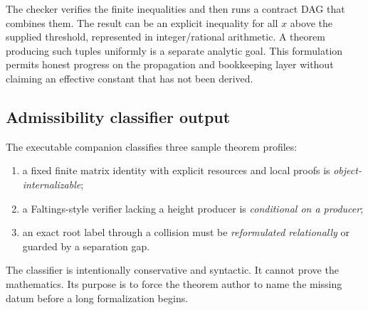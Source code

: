 The checker verifies the finite inequalities and then runs a contract DAG that combines them.  The result can be an explicit inequality for all $x$ above the supplied threshold, represented in integer/rational arithmetic.  A theorem producing such tuples uniformly is a separate analytic goal.  This formulation permits honest progress on the propagation and bookkeeping layer without claiming an effective constant that has not been derived.

\subsection{Admissibility classifier output}

The executable companion classifies three sample theorem profiles:

\begin{enumerate}
  \item a fixed finite matrix identity with explicit resources and local proofs is \emph{object-internalizable};
  \item a Faltings-style verifier lacking a height producer is \emph{conditional on a producer};
  \item an exact root label through a collision must be \emph{reformulated relationally} or guarded by a separation gap.
\end{enumerate}

The classifier is intentionally conservative and syntactic.  It cannot prove the mathematics.  Its purpose is to force the theorem author to name the missing datum before a long formalization begins.
